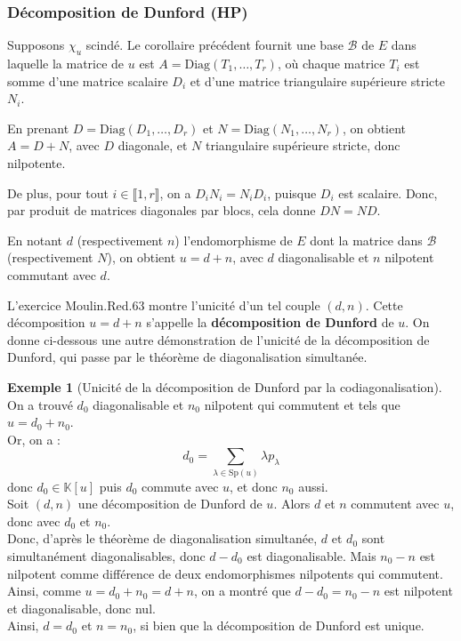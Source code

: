 \documentclass[french]{article}
\newcommand{\K}{\mathbb{K}}
\newcommand{\Sp}{\text{Sp}}
\theoremstyle{plain}
\theoremstyle{definition}
\newtheorem*{ex}{Exemple}
\theoremstyle{remark}
\begin{document}
	\subsubsection*{Décomposition de Dunford (HP)}
		Supposons $\chi_u$ scindé. Le corollaire précédent fournit une base $\mathcal{B}$ de $E$ dans laquelle la matrice de $u$ est $A=\text{Diag}(T_1,\ldots,T_r)$, où chaque matrice $T_i$ est somme d'une matrice scalaire $D_i$ et d'une matrice triangulaire supérieure stricte $N_i$.
		
		En prenant $D=\text{Diag}(D_1,\ldots,D_r)$ et $N=\text{Diag}(N_1,\ldots,N_r)$, on obtient $A=D+N$, avec $D$ diagonale, et $N$ triangulaire supérieure stricte, donc nilpotente.
		
		De plus, pour tout $i\in\llbracket1,r\rrbracket$, on a $D_iN_i=N_iD_i$, puisque $D_i$ est scalaire. Donc, par produit de matrices diagonales par blocs, cela donne $DN=ND$.
		
		
		En notant $d$ (respectivement $n$) l'endomorphisme de $E$ dont la matrice dans $\mathcal{B}$ (respectivement $N$), on obtient $u=d+n$, avec $d$ diagonalisable et $n$ nilpotent commutant avec $d$.
		
		
		L'exercice Moulin.Red.63 montre l'unicité d'un tel couple $(d,n)$. Cette décomposition $u=d+n$ s'appelle la \textbf{décomposition de Dunford} de $u$. On donne ci-dessous une autre démonstration de l'unicité de la décomposition de Dunford, qui passe par le théorème de diagonalisation simultanée.
	
	\begin{ex}[Unicité de la décomposition de Dunford par la codiagonalisation]
		On a trouvé $d_0$ diagonalisable et $n_0$ nilpotent qui commutent et tels que $u=d_0+n_0$.\\
		Or, on a : $$d_0=\sum_{\lambda\in\Sp(u)}\lambda p_\lambda$$ donc $d_0\in\K[u]$ puis $d_0$ commute avec $u$, et donc $n_0$ aussi.\\
		Soit $(d,n)$ une décomposition de Dunford de $u$. Alors $d$ et $n$ commutent avec $u$, donc avec $d_0$ et $n_0$. \\
		Donc, d'après le théorème de diagonalisation simultanée, $d$ et $d_0$ sont simultanément diagonalisables, donc $d-d_0$ est diagonalisable. Mais $n_0-n$ est nilpotent comme différence de deux endomorphismes nilpotents qui commutent.\\
		Ainsi, comme $u=d_0+n_0=d+n$, on a montré que $d-d_0=n_0-n$ est nilpotent et diagonalisable, donc nul.\\
		Ainsi, $d=d_0$ et $n=n_0$, si bien que la décomposition de Dunford est unique.
		
	\end{ex}
	
\end{document}
